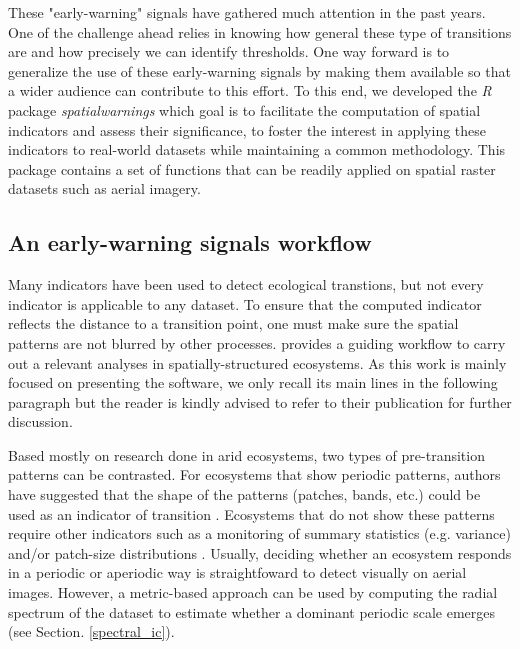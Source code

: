 \documentclass{article}
\begin{document}
These "early-warning" signals have gathered much attention in the past years. 
One of the challenge ahead relies in knowing how general these type of 
transitions are and how precisely we can identify thresholds. One way forward 
is to generalize the use of these early-warning signals by making them available 
so that a wider audience can contribute to this effort. To this end, we 
developed the \emph{R} package \emph{spatialwarnings} which goal is to 
facilitate the computation of spatial indicators and assess their significance, 
to foster the interest in applying these indicators to real-world datasets 
while maintaining a common methodology. This package contains a set of 
functions that can be readily applied on spatial raster datasets such as 
aerial imagery. 

\subsection*{An early-warning signals workflow}

Many indicators have been used to detect ecological transtions, but not every 
indicator is applicable to any dataset. To ensure that the computed indicator 
reflects the distance to a transition point, one must make sure the spatial 
patterns are not blurred by other processes. \citet{kefi2014} provides a guiding 
workflow to carry out a relevant analyses in spatially-structured ecosystems. As
this work is mainly focused on presenting the software, we only recall its main 
lines in the following paragraph but the reader is kindly advised to refer to 
their publication for further discussion. 

Based mostly on research done in arid ecosystems, two types of 
pre-transition patterns can be contrasted. For ecosystems that show periodic 
patterns, authors have suggested that the shape of the patterns (patches, bands, 
etc.) could be used as an indicator of transition \citep{rietkerk2004}. 
Ecosystems that do not show these patterns require other indicators such as a 
monitoring of summary statistics (e.g. variance) and/or patch-size distributions 
\citep{kefi2011}. Usually, deciding whether an ecosystem responds in a periodic 
or aperiodic way is straightfoward to detect visually on aerial images. However, 
a metric-based approach can be used by computing the radial spectrum of the 
dataset to estimate whether a dominant periodic scale emerges (see Section. 
\ref{spectral_ic}). 

\end{document}
